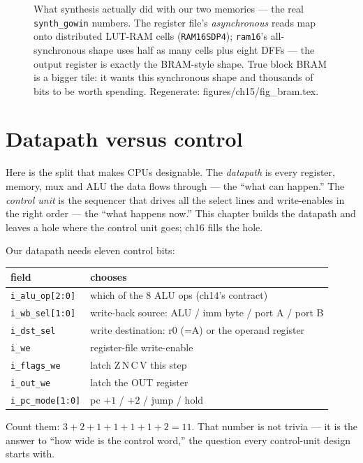 \begin{figure}[htbp]
\centering

\caption{What synthesis actually did with our two memories ---
the real \texttt{synth\_gowin} numbers. The register file's
\emph{asynchronous} reads map onto distributed LUT-RAM cells
(\texttt{RAM16SDP4}); \texttt{ram16}'s all-synchronous shape uses half
as many cells plus eight DFFs --- the output register is exactly the
BRAM-style shape. True block BRAM is a bigger tile: it wants this
synchronous shape and thousands of bits to be worth spending.
Regenerate: \ttfamily figures/ch15/fig\_bram.tex.}
\label{fig:bram15}
\end{figure}

\section{Datapath versus control}\label{sec:control15}

Here is the split that makes CPUs designable. The \emph{datapath} is
every register, memory, mux and ALU the data flows through --- the
``what can happen.'' The \emph{control unit} is the sequencer that
drives all the select lines and write-enables in the right order ---
the ``what happens now.'' This chapter builds the datapath and leaves
a hole where the control unit goes; ch16 fills the hole.

Our datapath needs eleven control bits:

\begin{center}
\begin{tabular}{ll}
\toprule
field & chooses\\
\midrule
\texttt{i\_alu\_op[2:0]} & which of the 8 ALU ops (ch14's contract)\\
\texttt{i\_wb\_sel[1:0]} & write-back source: ALU / imm byte / port A / port B\\
\texttt{i\_dst\_sel} & write destination: r0 (=A) or the operand register\\
\texttt{i\_we} & register-file write-enable\\
\texttt{i\_flags\_we} & latch Z\,N\,C\,V this step\\
\texttt{i\_out\_we} & latch the OUT register\\
\texttt{i\_pc\_mode[1:0]} & pc $+1$ / $+2$ / jump / hold\\
\bottomrule
\end{tabular}
\end{center}

Count them: $3+2+1+1+1+1+2=11$. That number is not trivia --- it is
the answer to ``how wide is the control word,'' the question every
control-unit design starts with.

